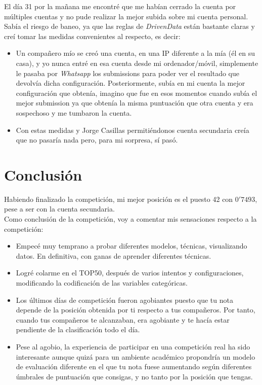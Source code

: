 \documentclass[paper=a4, fontsize=12pt]{article} %
\numberwithin{equation}{section} %
\numberwithin{figure}{section} %
\numberwithin{table}{section} %
\begin{document}
El día 31 por la mañana me encontré que me habían cerrado la cuenta por múltiples cuentas y no pude realizar la mejor subida sobre mi cuenta personal. Sabía el riesgo de baneo, ya que las reglas de \textit{DrivenData} están bastante claras y creí tomar las medidas convenientes al respecto, es decir:

\begin{itemize}
\item  Un compañero mío se creó una cuenta, en una IP diferente a la mía (él en su casa), y yo nunca entré en esa cuenta desde mi ordenador/móvil, simplemente le pasaba por \textit{Whatsapp} los submissions para poder ver el resultado que devolvía dicha configuración. Posteriormente, subía en mi cuenta la mejor configuración que obtenía, imagino que fue en esos momentos cuando subía el mejor submission ya que obtenía la misma puntuación que otra cuenta y era sospechoso y me tumbaron la cuenta. 

\item Con estas medidas y Jorge Casillas permitiéndonos cuenta secundaria creía que no pasaría nada pero, para mi sorpresa, sí pasó.
\end{itemize}

\section {Conclusión}
Habiendo finalizado la competición, mi mejor posición es el puesto 42 con $0'7493$, pese a ser con la cuenta secundaria. \\

Como conclusión de la competición, voy a comentar mis sensaciones respecto a la competición: 

\begin{itemize}
\item Empecé muy temprano a probar diferentes modelos, técnicas, visualizando datos. En definitiva, con ganas de aprender diferentes técnicas.
\item Logré colarme en el TOP50, después de varios intentos y configuraciones, modificando la codificación de las variables categóricas.
\item Los últimos días de competición fueron agobiantes puesto que tu nota depende de la posición obtenida por ti respecto a tus compañeros. Por tanto, cuando tus compañeros te alcanzaban, era agobiante y te hacía estar pendiente de la clasificación todo el día. 
\item Pese al agobio, la experiencia de participar en una competición real ha sido interesante aunque quizá para un ambiente académico propondría un modelo de evaluación diferente en el que tu nota fuese aumentando según diferentes úmbrales de puntuación que consigas, y no tanto por la posición que tengas.

\end{itemize}
\end{document}
